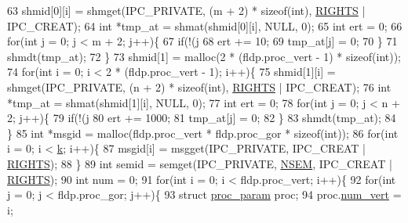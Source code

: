 \begin{DoxyCode}
{{{{63         shmid[0][i] = shmget(IPC\_PRIVATE, (m + 2) * \textcolor{keyword}{sizeof}(\textcolor{keywordtype}{int}), \hyperlink{life-client_8c_a06fc87d81c62e9abb8790b6e5713c55bafa588afcf6a1d45e5503f8fb1f189df2}{RIGHTS} | IPC\_CREAT);
64         \textcolor{keywordtype}{int} *tmp\_at = shmat(shmid[0][i], NULL, 0);
65         \textcolor{keywordtype}{int} ert = 0;
66         \textcolor{keywordflow}{for}(\textcolor{keywordtype}{int} j = 0; j < m + 2; j++)\{
67             \textcolor{keywordflow}{if}(!(j %
68                 ert += 10;
69             tmp\_at[j] = 0;
70         \}
71         shmdt(tmp\_at);
72     \}
73     shmid[1] = malloc(2 * (fldp.proc\_vert - 1) * \textcolor{keyword}{sizeof}(\textcolor{keywordtype}{int}));
74     \textcolor{keywordflow}{for}(\textcolor{keywordtype}{int} i = 0; i < 2 * (fldp.proc\_vert - 1); i++)\{
75         shmid[1][i] = shmget(IPC\_PRIVATE, (n + 2) * \textcolor{keyword}{sizeof}(\textcolor{keywordtype}{int}), \hyperlink{life-client_8c_a06fc87d81c62e9abb8790b6e5713c55bafa588afcf6a1d45e5503f8fb1f189df2}{RIGHTS} | IPC\_CREAT);
76         \textcolor{keywordtype}{int} *tmp\_at = shmat(shmid[1][i], NULL, 0);
77         \textcolor{keywordtype}{int} ert = 0;
78         \textcolor{keywordflow}{for}(\textcolor{keywordtype}{int} j = 0; j < n + 2; j++)\{
79             \textcolor{keywordflow}{if}(!(j %
80                 ert += 1000;
81             tmp\_at[j] = 0;
82         \}
83         shmdt(tmp\_at);
84     \}
85     \textcolor{keywordtype}{int} *msgid = malloc(fldp.proc\_vert * fldp.proc\_gor * \textcolor{keyword}{sizeof}(\textcolor{keywordtype}{int}));
86     \textcolor{keywordflow}{for}(\textcolor{keywordtype}{int} i = 0; i < \hyperlink{structfld__param_ab66ed8e0098c0a86b458672a55a9cca9}{k}; i++)\{
87         msgid[i] = msgget(IPC\_PRIVATE, IPC\_CREAT | \hyperlink{life-client_8c_a06fc87d81c62e9abb8790b6e5713c55bafa588afcf6a1d45e5503f8fb1f189df2}{RIGHTS});
88     \}
89     \textcolor{keywordtype}{int} semid = semget(IPC\_PRIVATE, \hyperlink{lifeop_8h_adf764cbdea00d65edcd07bb9953ad2b7a0385140bd6852dca24e9062841fd3bd8}{NSEM}, IPC\_CREAT | \hyperlink{life-client_8c_a06fc87d81c62e9abb8790b6e5713c55bafa588afcf6a1d45e5503f8fb1f189df2}{RIGHTS});
90     \textcolor{keywordtype}{int} num = 0;
91     \textcolor{keywordflow}{for}(\textcolor{keywordtype}{int} i = 0; i < fldp.proc\_vert; i++)\{
92         \textcolor{keywordflow}{for}(\textcolor{keywordtype}{int} j = 0; j < fldp.proc\_gor; j++)\{
93             \textcolor{keyword}{struct }\hyperlink{structproc__param}{proc\_param} proc;
94             proc.\hyperlink{structproc__param_a9072610d26440867757053b0511091df}{num\_vert} = i;
}}}}
\end{DoxyCode}
